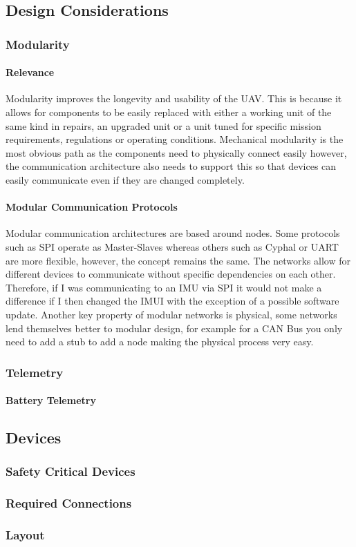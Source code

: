 \subsection{Design Considerations}
\subsubsection{Modularity}
\paragraph{Relevance}
Modularity improves the longevity and usability of the \gls{UAV}. This is because it allows for components to be easily replaced with either a working unit of the same kind in repairs, an upgraded unit or a unit tuned for specific mission requirements, regulations or operating conditions. Mechanical modularity is the most obvious path as the components need to physically connect easily however, the communication architecture also needs to support this so that devices can easily communicate even if they are changed completely.
\paragraph{Modular Communication Protocols}
Modular communication architectures are based around nodes. Some protocols such as \gls{SPI} operate as Master-Slaves whereas others such as Cyphal or \gls{UART} are more flexible, however, the concept remains the same. The networks allow for different devices to communicate without specific dependencies on each other. Therefore, if I was communicating to an \gls{IMU} via \gls{SPI} it would not make a difference if I then changed the \gls{IMUI} with the exception of a possible software update. Another key property of modular networks is physical, some networks lend themselves better to modular design, for example for a \gls{CAN} Bus you only need to add a stub to add a node making the physical process very easy.

\subsubsection{Telemetry}
\paragraph{Battery Telemetry}

\subsection{Devices}
\subsubsection{Safety Critical Devices}
\subsubsection{Required Connections}
\subsubsection{Layout}


